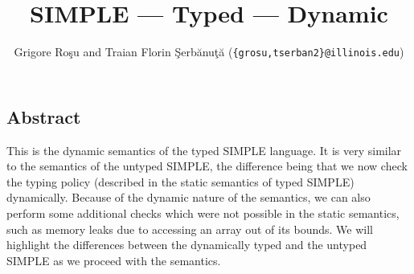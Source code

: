 \setlength{\parindent}{1em}
\title{SIMPLE --- Typed --- Dynamic}
\author{Grigore Ro\c{s}u and 
        Traian Florin \c{S}erb\u{a}nu\c{t}\u{a}
        (\texttt{\{grosu,tserban2\}@illinois.edu})}

\maketitle

\begin{latexComment}
\section{Abstract}
This is the \K dynamic semantics of the typed SIMPLE language.
It is very similar to the semantics of the untyped SIMPLE, the
difference being that we now check the typing policy (described in
the static semantics of typed SIMPLE) dynamically.  Because of the
dynamic nature of the semantics, we can also perform some additional
checks which were not possible in the static semantics, such as
memory leaks due to accessing an array out of its bounds.  We will
highlight the differences between the dynamically typed and the
untyped SIMPLE as we proceed with the semantics.
\end{latexComment}

\vspace*{3ex}
